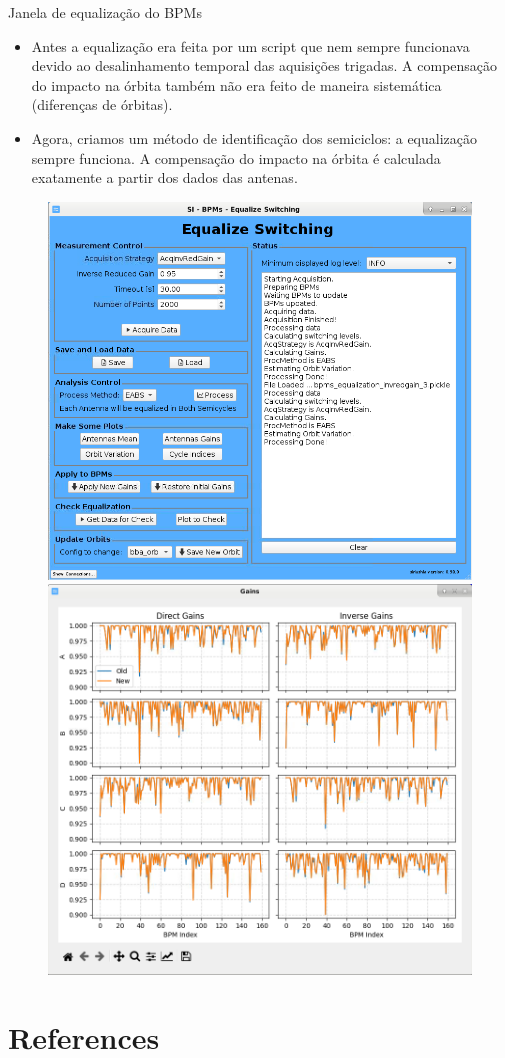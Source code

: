 \documentclass{beamer}					  %
\begin{document}
\begin{frame}{Janela de equalização do BPMs}
    \begin{itemize}
        \scriptsize
        \item Antes a equalização era feita por um script que nem sempre funcionava devido ao desalinhamento temporal das aquisições trigadas. A compensação do impacto na órbita também não era feito de maneira sistemática (diferenças de órbitas).
        \item Agora, criamos um método de identificação dos semiciclos: a equalização sempre funciona. A compensação do impacto na órbita é calculada exatamente a partir dos dados das antenas.
    \end{itemize}
    \begin{figure}[H]
   		\centering
        \includegraphics[width=.48\textwidth]{
            2023-11-17/figures/bpms_equalization_window.png}
        \includegraphics[width=.48\textwidth]{2023-11-17/figures/bpms_gains.png}
        \label{fig:bpmseq_window}
    \end{figure}
\end{frame}

\section{References}
\end{document}
